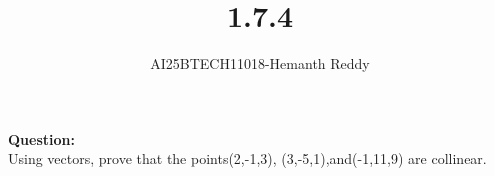\documentclass[journal]{IEEEtran}
\begin{document}

\vspace{3cm}

\title{1.7.4}
\author{AI25BTECH11018-Hemanth Reddy}
 \maketitle
{\let\newpage\relax\maketitle}

\renewcommand{\thefigure}{\theenumi}
\renewcommand{\thetable}{\theenumi}
\setlength{\intextsep}{10pt} %


\renewcommand{\thetable}{\theenumi}

\textbf{Question:}\\
Using vectors, prove that the points(2,-1,3), (3,-5,1),and(-1,11,9) are collinear.
\end{document}
